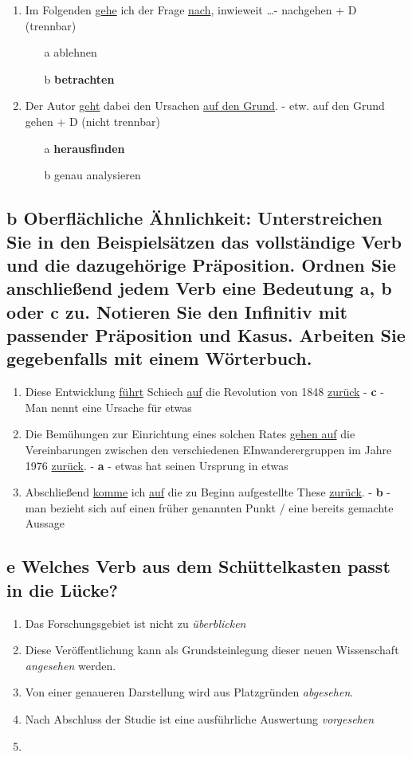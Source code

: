 \documentclass{article}
\begin{document}
\begin{enumerate}
				\item{Im Folgenden \underline{gehe} ich der Frage \underline{nach}, inwieweit \dots - nachgehen + D (trennbar)}
		\begin{itemize}
			\item[a]{ablehnen}
			\item[b]{\textbf{betrachten}}
		\end{itemize}
				\item{Der Autor \underline{geht} dabei den Ursachen \underline{auf den Grund}. - etw. auf den Grund gehen + D (nicht trennbar)}
		\begin{itemize}
			\item[a]{\textbf{herausfinden}}
			\item[b]{genau analysieren}
		\end{itemize}
	\end{enumerate}

	\subsection*{\textbf{b} Oberflächliche Ähnlichkeit: Unterstreichen Sie in den Beispielsätzen das vollständige Verb und die dazugehörige Präposition. Ordnen Sie anschließend jedem Verb eine Bedeutung a, b oder c zu. Notieren Sie den Infinitiv mit passender Präposition und Kasus. Arbeiten Sie gegebenfalls mit einem Wörterbuch.}
	\begin{enumerate}
		\item{Diese Entwicklung \underline{führt} Schiech \underline{auf} die Revolution von 1848 \underline{zurück} - \textbf{c} - Man nennt eine Ursache für etwas}
		\item{Die Bemühungen zur Einrichtung eines solchen Rates \underline{gehen auf} die Vereinbarungen zwischen den verschiedenen EInwanderergruppen im Jahre 1976 \underline{zurück}. - \textbf{a} - etwas hat seinen Ursprung in etwas}
		\item{Abschließend \underline{komme} ich \underline{auf} die zu Beginn aufgestellte These \underline{zurück}. - \textbf{b} - man bezieht sich auf einen früher genannten Punkt / eine bereits gemachte Aussage}
	\end{enumerate}
	\subsection*{\textbf{e} Welches Verb aus dem Schüttelkasten passt in die Lücke?}
	\begin{enumerate}
		\item{Das Forschungsgebiet ist nicht zu \textit{überblicken}}
		\item{Diese Veröffentlichung kann als Grundsteinlegung dieser neuen Wissenschaft \textit{angesehen} werden.}
		\item{Von einer genaueren Darstellung wird aus Platzgründen \textit{abgesehen}.}
		\item{Nach Abschluss der Studie ist eine ausführliche Auswertung \textit{vorgesehen}}
		\item{}
	\end{enumerate}
\end{document}
